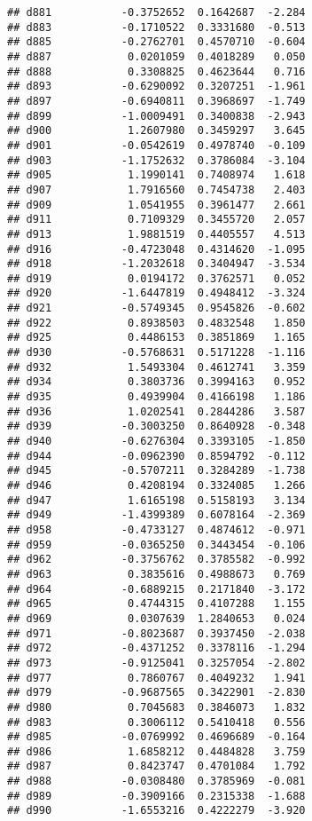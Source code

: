 \documentclass[
]{article}
\begin{document}
\begin{verbatim}
## d881           -0.3752652  0.1642687  -2.284
## d883           -0.1710522  0.3331680  -0.513
## d885           -0.2762701  0.4570710  -0.604
## d887            0.0201059  0.4018289   0.050
## d888            0.3308825  0.4623644   0.716
## d893           -0.6290092  0.3207251  -1.961
## d897           -0.6940811  0.3968697  -1.749
## d899           -1.0009491  0.3400838  -2.943
## d900            1.2607980  0.3459297   3.645
## d901           -0.0542619  0.4978740  -0.109
## d903           -1.1752632  0.3786084  -3.104
## d905            1.1990141  0.7408974   1.618
## d907            1.7916560  0.7454738   2.403
## d909            1.0541955  0.3961477   2.661
## d911            0.7109329  0.3455720   2.057
## d913            1.9881519  0.4405557   4.513
## d916           -0.4723048  0.4314620  -1.095
## d918           -1.2032618  0.3404947  -3.534
## d919            0.0194172  0.3762571   0.052
## d920           -1.6447819  0.4948412  -3.324
## d921           -0.5749345  0.9545826  -0.602
## d922            0.8938503  0.4832548   1.850
## d925            0.4486153  0.3851869   1.165
## d930           -0.5768631  0.5171228  -1.116
## d932            1.5493304  0.4612741   3.359
## d934            0.3803736  0.3994163   0.952
## d935            0.4939904  0.4166198   1.186
## d936            1.0202541  0.2844286   3.587
## d939           -0.3003250  0.8640928  -0.348
## d940           -0.6276304  0.3393105  -1.850
## d944           -0.0962390  0.8594792  -0.112
## d945           -0.5707211  0.3284289  -1.738
## d946            0.4208194  0.3324085   1.266
## d947            1.6165198  0.5158193   3.134
## d949           -1.4399389  0.6078164  -2.369
## d958           -0.4733127  0.4874612  -0.971
## d959           -0.0365250  0.3443454  -0.106
## d962           -0.3756762  0.3785582  -0.992
## d963            0.3835616  0.4988673   0.769
## d964           -0.6889215  0.2171840  -3.172
## d965            0.4744315  0.4107288   1.155
## d969            0.0307639  1.2840653   0.024
## d971           -0.8023687  0.3937450  -2.038
## d972           -0.4371252  0.3378116  -1.294
## d973           -0.9125041  0.3257054  -2.802
## d977            0.7860767  0.4049232   1.941
## d979           -0.9687565  0.3422901  -2.830
## d980            0.7045683  0.3846073   1.832
## d983            0.3006112  0.5410418   0.556
## d985           -0.0769992  0.4696689  -0.164
## d986            1.6858212  0.4484828   3.759
## d987            0.8423747  0.4701084   1.792
## d988           -0.0308480  0.3785969  -0.081
## d989           -0.3909166  0.2315338  -1.688
## d990           -1.6553216  0.4222279  -3.920

\end{verbatim}
\end{document}
